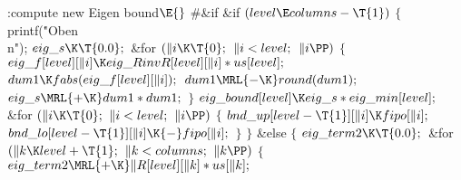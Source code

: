 \B{}:compute new Eigen bound\X${}\E{}$\6
\8\#\&{if} \6
\&{if} ${}(\\{level}\E\\{columns}-\T{1}){}$\5
${}\{{}$\1\6
\\{printf}(\.{"Oben\\n"});\6
${}\\{eig\_s}\K\T{0.0};{}$\6
\&{for} ${}(\|i\K\T{0};{}$ ${}\|i<\\{level};{}$ ${}\|i\PP){}$\5
${}\{{}$\1\6
${}\\{eig\_f}[\\{level}][\|i]\K\\{eig\_RinvR}[\\{level}][\|i]*\\{us}[%
\\{level}];{}$\6
${}\\{dum1}\K\\{fabs}(\\{eig\_f}[\\{level}][\|i]);{}$\6
${}\\{dum1}\MRL{-{\K}}\\{round}(\\{dum1});{}$\6
${}\\{eig\_s}\MRL{+{\K}}\\{dum1}*\\{dum1};{}$\6
\4${}\}{}$\2\6
${}\\{eig\_bound}[\\{level}]\K\\{eig\_s}*\\{eig\_min}[\\{level}];{}$\6
\&{for} ${}(\|i\K\T{0};{}$ ${}\|i<\\{level};{}$ ${}\|i\PP){}$\5
${}\{{}$\1\6
${}\\{bnd\_up}[\\{level}-\T{1}][\|i]\K\\{fipo}[\|i];{}$\6
${}\\{bnd\_lo}[\\{level}-\T{1}][\|i]\K{-}\\{fipo}[\|i];{}$\6
\4${}\}{}$\2\6
\4${}\}{}$\2\6
\&{else}\5
${}\{{}$\1\6
${}\\{eig\_term2}\K\T{0.0};{}$\6
\&{for} ${}(\|k\K\\{level}+\T{1};{}$ ${}\|k<\\{columns};{}$ ${}\|k\PP){}$\5
${}\{{}$\1\6
${}\\{eig\_term2}\MRL{+{\K}}\|R[\\{level}][\|k]*\\{us}[\|k];{}$\6
